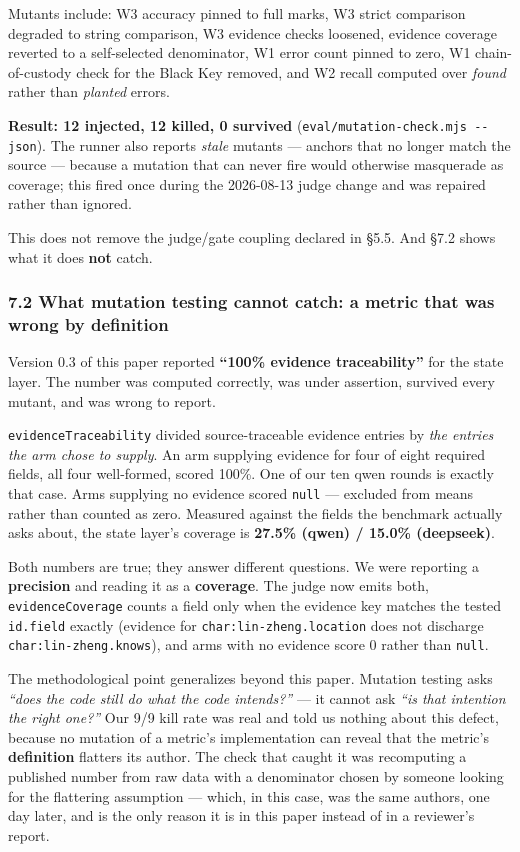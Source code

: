 \documentclass[
  english,
]{article}
\begin{document}
Mutants include: W3 accuracy pinned to full marks, W3 strict comparison
degraded to string comparison, W3 evidence checks loosened, evidence
coverage reverted to a self-selected denominator, W1 error count pinned
to zero, W1 chain-of-custody check for the Black Key removed, and W2
recall computed over \emph{found} rather than \emph{planted} errors.

\textbf{Result: 12 injected, 12 killed, 0 survived}
(\texttt{eval/mutation-check.mjs\ -\/-json}). The runner also reports
\emph{stale} mutants --- anchors that no longer match the source ---
because a mutation that can never fire would otherwise masquerade as
coverage; this fired once during the 2026-08-13 judge change and was
repaired rather than ignored.

This does not remove the judge/gate coupling declared in §5.5. And §7.2
shows what it does \textbf{not} catch.

\subsubsection{7.2 What mutation testing cannot catch: a metric that was
wrong by
definition}\label{what-mutation-testing-cannot-catch-a-metric-that-was-wrong-by-definition}

Version 0.3 of this paper reported \textbf{``100\% evidence
traceability''} for the state layer. The number was computed correctly,
was under assertion, survived every mutant, and was wrong to report.

\texttt{evidenceTraceability} divided source-traceable evidence entries
by \emph{the entries the arm chose to supply}. An arm supplying evidence
for four of eight required fields, all four well-formed, scored 100\%.
One of our ten qwen rounds is exactly that case. Arms supplying no
evidence scored \texttt{null} --- excluded from means rather than
counted as zero. Measured against the fields the benchmark actually asks
about, the state layer's coverage is \textbf{27.5\% (qwen) / 15.0\%
(deepseek)}.

Both numbers are true; they answer different questions. We were
reporting a \textbf{precision} and reading it as a \textbf{coverage}.
The judge now emits both, \texttt{evidenceCoverage} counts a field only
when the evidence key matches the tested \texttt{id.field} exactly
(evidence for \texttt{char:lin-zheng.location} does not discharge
\texttt{char:lin-zheng.knows}), and arms with no evidence score 0 rather
than \texttt{null}.

The methodological point generalizes beyond this paper. Mutation testing
asks \emph{``does the code still do what the code intends?''} --- it
cannot ask \emph{``is that intention the right one?''} Our 9/9 kill rate
was real and told us nothing about this defect, because no mutation of a
metric's implementation can reveal that the metric's \textbf{definition}
flatters its author. The check that caught it was recomputing a
published number from raw data with a denominator chosen by someone
looking for the flattering assumption --- which, in this case, was the
same authors, one day later, and is the only reason it is in this paper
instead of in a reviewer's report.
\end{document}
